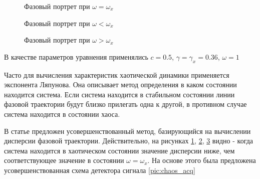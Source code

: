 \begin{figure}[H]
	\center{}
	\caption{Фазовый портрет при ${\omega =\omega_{x}}$}
	\label{pic:duffing_sync}
\end{figure}

\begin{figure}[H]
	\center{}
	\caption{Фазовый портрет при ${\omega < \omega_{x}}$}
	\label{pic:duffing_chaos1}
\end{figure}

\begin{figure}[H]
	\center{}
	\caption{Фазовый портрет при ${\omega > \omega_{x}}$}
	\label{pic:duffing_chaos2}
\end{figure}

В качестве параметров уравнения применялись $c = 0.5$, $\gamma=\gamma_{x}=0.36$, ${\omega=1}$

Часто для вычисления характеристик хаотической динамики применяется экспонента Ляпунова.
Она описывает метод определения в каком состоянии находится система. Если система находится
в стабильном состоянии линии фазовой траектории будут близко прилегать одна к другой, в противном
случае система находится в состоянии хаоса.

В статье \cite{chaos_chen} предложен усовершенствованный метод, базирующийся на вычислении дисперсии
фазовой траектории. Действительно, на рисунках \ref{pic:duffing_sync}, \ref{pic:duffing_chaos1},
\ref{pic:duffing_chaos2} видно - когда система находится в хаотическом состоянии значение
дисперсии ниже, чем соответствующее значение в состоянии $\omega = \omega_{x}$. На основе этого была
предложена усовершенствованная схема детектора сигнала \ref{pic:chaos_acq}


\newpage
